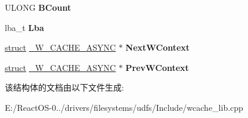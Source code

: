 \begin{DoxyCompactItemize}
\item 
\mbox{\label{struct___w___c_a_c_h_e___a_s_y_n_c_a0d1804096de7b8b69d5bc76095c231c1}} 
U\+L\+O\+NG {\bfseries B\+Count}
\item 
\mbox{\label{struct___w___c_a_c_h_e___a_s_y_n_c_ad29d8290860ad0126f2030a6078074ba}} 
lba\+\_\+t {\bfseries Lba}
\item 
\mbox{\label{struct___w___c_a_c_h_e___a_s_y_n_c_a9741a94a84becd45c63f2650ef655c6b}} 
\hyperlink{interfacestruct}{struct} \hyperlink{struct___w___c_a_c_h_e___a_s_y_n_c}{\+\_\+\+W\+\_\+\+C\+A\+C\+H\+E\+\_\+\+A\+S\+Y\+NC} $\ast$ {\bfseries Next\+W\+Context}
\item 
\mbox{\label{struct___w___c_a_c_h_e___a_s_y_n_c_abd308c4e70c6241a5f4028f2978cdca7}} 
\hyperlink{interfacestruct}{struct} \hyperlink{struct___w___c_a_c_h_e___a_s_y_n_c}{\+\_\+\+W\+\_\+\+C\+A\+C\+H\+E\+\_\+\+A\+S\+Y\+NC} $\ast$ {\bfseries Prev\+W\+Context}
\end{DoxyCompactItemize}


该结构体的文档由以下文件生成\+:\begin{DoxyCompactItemize}
\item 
E\+:/\+React\+O\+S-\/0../drivers/filesystems/udfs/\+Include/wcache\+\_\+lib.\+cpp\end{DoxyCompactItemize}
